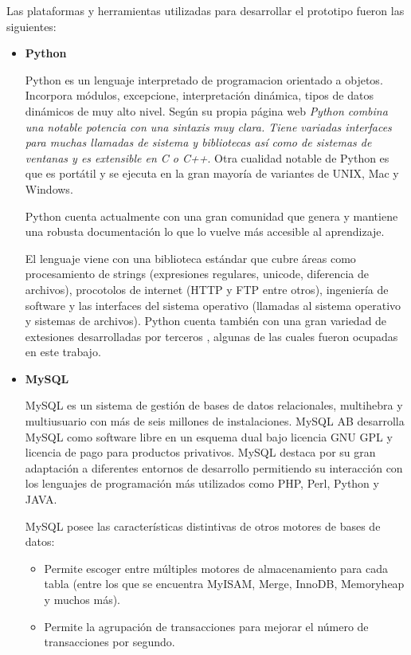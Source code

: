 	Las plataformas y herramientas utilizadas para desarrollar el prototipo fueron las siguientes:

\begin{itemize}
	\item \textbf{Python}
		
		Python es un lenguaje interpretado de programacion orientado a objetos. Incorpora módulos, excepcione, interpretación dinámica, tipos de datos dinámicos de muy alto nivel. Según su propia página web \cite{pythonWeb} \emph{Python combina una notable potencia con una sintaxis muy clara. Tiene variadas interfaces para muchas llamadas de sistema y bibliotecas así como de sistemas de ventanas y es extensible en C o C++}. Otra cualidad notable de Python es que es portátil y se ejecuta en la gran mayoría de variantes de UNIX, Mac y Windows.
		
		Python cuenta actualmente con una gran comunidad que genera y mantiene una robusta documentación lo que lo vuelve más accesible al aprendizaje.
		
		El lenguaje viene con una biblioteca estándar que cubre áreas como procesamiento de strings (expresiones regulares, unicode, diferencia de archivos), procotolos de internet (HTTP y FTP entre otros), ingeniería de software y las interfaces del sistema operativo (llamadas al sistema operativo y sistemas de archivos). Python cuenta también con una gran variedad de extesiones desarrolladas por terceros \cite{pythonPypiWeb}, algunas de las cuales fueron ocupadas en este trabajo.
		
		\item \textbf{MySQL}
		
		MySQL es un sistema de gestión de bases de datos relacionales, multihebra y multiusuario con más de seis millones de instalaciones. MySQL AB desarrolla MySQL como software libre en un esquema dual bajo licencia GNU GPL y licencia de pago para productos privativos. MySQL destaca por su gran adaptación a diferentes entornos de desarrollo permitiendo su interacción con los lenguajes de programación más utilizados como PHP, Perl, Python y JAVA. 
		
		MySQL posee las características distintivas de otros motores de bases de datos:
		\begin{itemize}
			\item Permite escoger entre múltiples motores de almacenamiento para cada tabla (entre los que se encuentra MyISAM, Merge, InnoDB, Memoryheap y muchos más).
			\item Permite la agrupación de  transacciones para mejorar el número de transacciones por segundo.
		\end{itemize}
		

\end{itemize}
